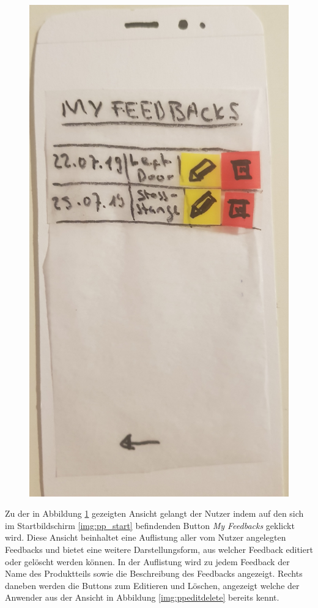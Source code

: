 \begin{figure}[H]
\begin{minipage}{.5\textwidth}
		\includegraphics[width=.8\linewidth]{resources/conception/lowfi_list.jpg}
		\label{fig:pplist}
	\end{minipage}
\end{figure}

Zu der in Abbildung \ref{fig:pplist} gezeigten Ansicht gelangt der Nutzer indem auf den sich im Startbildschirm \ref{img:pp_start} befindenden Button \textit{My Feedbacks} geklickt wird. 
Diese Ansicht beinhaltet eine Auflistung aller vom Nutzer angelegten Feedbacks und bietet eine weitere Darstellungsform, aus welcher Feedback editiert oder gelöscht werden können. 
In der Auflistung wird zu jedem Feedback der Name des Produktteils sowie die Beschreibung des Feedbacks angezeigt. Rechts daneben werden die Buttons zum Editieren und Löschen, angezeigt welche 
der Anwender aus der Ansicht in Abbildung \ref{img:ppeditdelete} bereits kennt.

